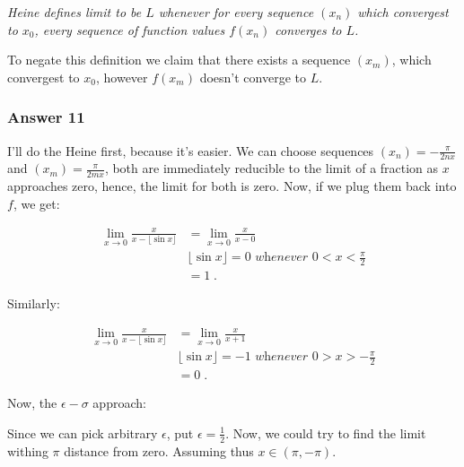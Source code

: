 \documentclass[a4paper]{article}
\begin{document}
\emph{Heine defines limit to be $L$ whenever for every sequence $(x_n)$ which
  convergest to $x_0$, every sequence of function values $f(x_n)$ converges
  to $L$.}

To negate this definition we claim that there exists a sequence \((x_m)\),
which convergest to \(x_0\), however \(f(x_m)\) doesn't converge to \(L\).

\subsubsection{Answer 11}
\label{sec:orgheadline14}
I'll do the Heine first, because it's easier.  We can choose sequences
\((x_n) = -\frac{\pi}{2nx}\) and \((x_m) = \frac{\pi}{2mx}\), both are
immediately reducible to the limit of a fraction as \(x\) approaches zero,
hence, the limit for both is zero.  Now, if we plug them back into \(f\), we
get:

\begin{align*}
  \lim_{x \to 0}\frac{x}{x - \lfloor \sin x \rfloor}
  &= \lim_{x \to 0}\frac{x}{x - 0} \\
  &\textit{$\lfloor \sin x \rfloor = 0$ whenever $0 < x < \frac{\pi}{2}$} \\
  &= 1\;.
\end{align*}

Similarly:

\begin{align*}
  \lim_{x \to 0}\frac{x}{x - \lfloor \sin x \rfloor} 
  &= \lim_{x \to 0}\frac{x}{x + 1} \\
  &\textit{$\lfloor \sin x \rfloor = -1$ whenever $0 > x > -\frac{\pi}{2}$} \\ 
  &= 0\;.
\end{align*}

Now, the \(\epsilon-\sigma\) approach:

Since we can pick arbitrary \(\epsilon\), put \(\epsilon = \frac{1}{2}\). Now, we
could try to find the limit withing \(\pi\) distance from zero.  Assuming thus
\(x \in (\pi, -\pi)\).
\end{document}
